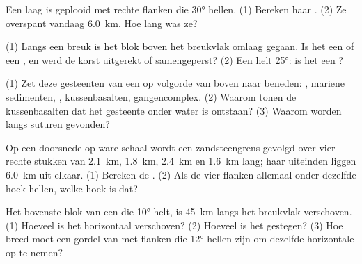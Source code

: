 \begin{exercise}[$\star$]\label{exo:g12:mountain-building:3}
Een laag is geplooid met rechte flanken die \ang{30} hellen. (1) Bereken haar
. (2) Ze overspant vandaag \qty{6.0}{km}. Hoe lang was ze?
\end{exercise}

\begin{exercise}[$\star$]\label{exo:g12:mountain-building:4}
(1) Langs een breuk is het blok boven het breukvlak omlaag gegaan. Is het een
 of een , en werd de korst uitgerekt of samengeperst?
(2) Een  helt \ang{25}: is het een ?
\end{exercise}

\begin{exercise}[$\star$]\label{exo:g12:mountain-building:5}
(1) Zet deze gesteenten van een  op volgorde van boven naar beneden: ,
mariene sedimenten, , kussenbasalten, gangencomplex. (2) Waarom tonen de
kussenbasalten dat het gesteente onder water is ontstaan? (3) Waarom worden
 langs suturen gevonden?
\end{exercise}

\begin{exercise}[$\star\star$]\label{exo:g12:mountain-building:6}
Op een doorsnede op ware schaal wordt een zandsteengrens gevolgd over vier
rechte stukken van \qty{2.1}{km}, \qty{1.8}{km}, \qty{2.4}{km} en
\qty{1.6}{km} lang; haar uiteinden liggen \qty{6.0}{km} uit elkaar. (1) Bereken de
. (2) Als de vier flanken allemaal onder dezelfde hoek hellen, welke hoek is dat?
\end{exercise}

\begin{exercise}[$\star\star$]\label{exo:g12:mountain-building:7}
Het bovenste blok van een  die \ang{10} helt, is \qty{45}{km} langs het
breukvlak verschoven. (1) Hoeveel is het horizontaal verschoven? (2) Hoeveel is
het gestegen? (3) Hoe breed moet een gordel van  met flanken die \ang{12} hellen zijn
om dezelfde horizontale  op te nemen?
\end{exercise}

